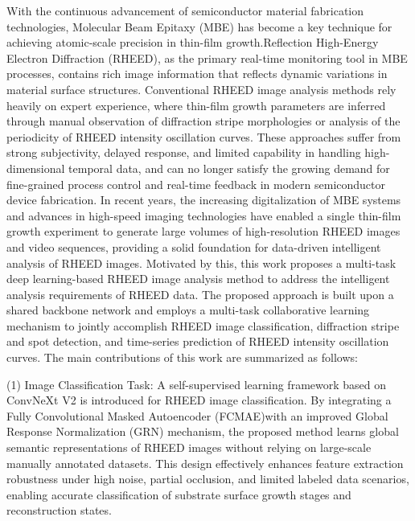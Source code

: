 \begin{abstractEN}

\setlength{\baselineskip}{23pt} %
With the continuous advancement of semiconductor material fabrication technologies, Molecular Beam Epitaxy\allowbreak{} (MBE) has become a key technique for achieving atomic-scale precision in thin-film growth.\linebreak Reflection High-Energy Electron Diffraction\allowbreak{} (RHEED), as the primary real-time monitoring tool in MBE processes, contains rich image information that reflects dynamic variations in material surface structures. Conventional RHEED image analysis methods rely heavily on expert experience, where thin-film growth parameters are inferred through manual observation of diffraction stripe morphologies or analysis of the periodicity of RHEED intensity oscillation curves. These approaches suffer from strong subjectivity, delayed response, and limited capability in handling high-dimensional temporal data, and can no longer satisfy the growing demand for fine-grained process control and real-time feedback in modern semiconductor device fabrication. In recent years, the increasing digitalization of MBE systems and advances in high-speed imaging technologies have enabled a single thin-film growth experiment to generate large volumes of high-resolution RHEED images and video sequences, providing a solid foundation for data-driven intelligent analysis of RHEED images. Motivated by this, this work proposes a multi-task deep learning-based RHEED image analysis method to address the intelligent analysis requirements of RHEED data. The proposed approach is built upon a shared backbone network and employs a multi-task collaborative learning mechanism to jointly accomplish RHEED image classification, diffraction stripe and spot detection, and time-series prediction of RHEED intensity oscillation curves. The main contributions of this work are summarized as follows:

(1) Image Classification Task: A self-supervised learning framework based on ConvNeXt V2 is introduced for RHEED image classification. By integrating a Fully Convolutional Masked Autoencoder\allowbreak{} (FCMAE)\linebreak with an improved Global Response Normalization\allowbreak{} (GRN) mechanism, the proposed method learns global semantic representations of RHEED images without relying on large-scale manually annotated datasets. This design effectively enhances feature extraction robustness under high noise, partial occlusion, and limited labeled data scenarios, enabling accurate classification of substrate surface growth stages and reconstruction states.


\end{abstractEN}

